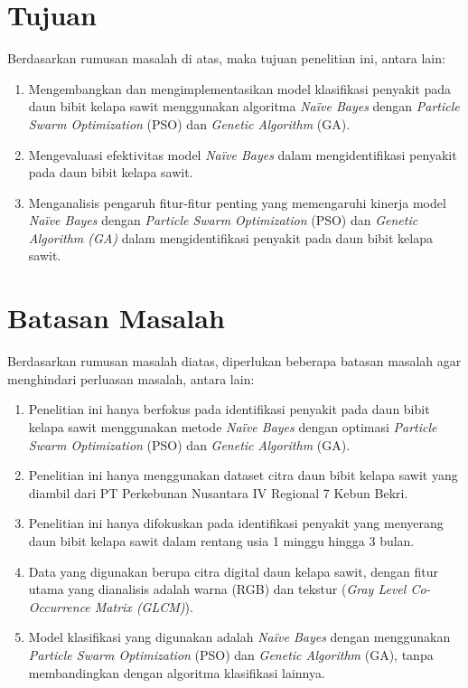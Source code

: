 \section{Tujuan} \label{I.Tujuan}
\indent Berdasarkan rumusan masalah di atas, maka tujuan penelitian ini, antara lain:
\begin{enumerate}[noitemsep]
	\item Mengembangkan dan mengimplementasikan model klasifikasi penyakit pada daun bibit kelapa sawit menggunakan algoritma \textit{Naïve Bayes} dengan \textit{Particle Swarm Optimization} (PSO) dan \textit{Genetic Algorithm} (GA).
	\item Mengevaluasi efektivitas model \textit{Naïve Bayes} dalam mengidentifikasi penyakit pada daun bibit kelapa sawit.
	\item Menganalisis pengaruh fitur-fitur penting yang memengaruhi kinerja model \textit{Naïve Bayes} dengan \textit{Particle Swarm Optimization} (PSO) dan \textit{Genetic Algorithm (GA)} dalam mengidentifikasi penyakit pada daun bibit kelapa sawit.
\end{enumerate}

\section{Batasan Masalah} \label{I.Batasan}
\indent Berdasarkan rumusan masalah diatas, diperlukan beberapa batasan masalah agar menghindari perluasan masalah, antara lain:
\begin{enumerate}[noitemsep]
	\item Penelitian ini hanya berfokus pada identifikasi penyakit pada daun bibit kelapa sawit menggunakan metode \textit{Naïve Bayes} dengan optimasi \textit{Particle Swarm Optimization} (PSO) dan \textit{Genetic Algorithm} (GA).
	\item Penelitian ini hanya menggunakan dataset citra daun bibit kelapa sawit yang diambil dari PT Perkebunan Nusantara IV Regional 7 Kebun Bekri.
	\item Penelitian ini hanya difokuskan pada identifikasi penyakit yang menyerang daun bibit kelapa sawit dalam rentang usia 1 minggu hingga 3 bulan.
	\item Data yang digunakan berupa citra digital daun kelapa sawit, dengan fitur utama yang dianalisis adalah warna (RGB) dan tekstur (\textit{Gray Level Co-Occurrence Matrix (GLCM)}).
	\item Model klasifikasi yang digunakan adalah \textit{Naïve Bayes} dengan menggunakan \textit{Particle Swarm Optimization} (PSO) dan \textit{Genetic Algorithm} (GA), tanpa membandingkan dengan algoritma klasifikasi lainnya.
\end{enumerate}


